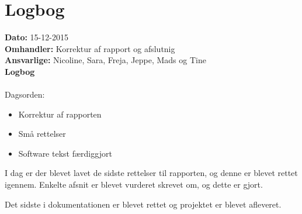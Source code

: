 \section{Logbog}

\textbf{Dato:} 15-12-2015\\
\textbf{Omhandler:} Korrektur af rapport og afslutnig\\
\textbf{Ansvarlige:} Nicoline, Sara, Freja, Jeppe, Mads og Tine\\
\textbf{Logbog}
\\
\\
Dagsorden:
\begin{itemize}
	\item Korrektur af rapporten
	\item Små rettelser 
	\item Software tekst færdiggjort
\end{itemize}
I dag er der blevet lavet de sidste rettelser til rapporten, og denne er blevet rettet igennem. Enkelte afsnit er blevet vurderet skrevet om, og dette er gjort. 

Det sidste i dokumentationen er blevet rettet og projektet er blevet afleveret. 
